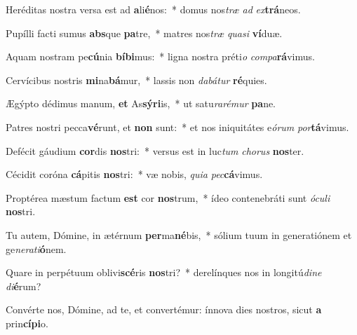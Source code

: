 \item Heréditas nostra versa est ad \textbf{a}li\textbf{é}nos:~* domus nos\textit{træ} \textit{ad} \textit{ex}\textbf{trá}neos.
\item Pupílli facti sumus \textbf{abs}que \textbf{pa}tre,~* matres nos\textit{træ} \textit{qua}\textit{si} \textbf{ví}duæ.
\item Aquam nostram pe\textbf{cú}nia \textbf{bí}\textbf{bi}mus:~* ligna nostra préti\textit{o} \textit{com}\textit{pa}\textbf{rá}vimus.
\item Cervícibus nostris \textbf{mi}na\textbf{bá}mur,~* lassis non \textit{da}\textit{bá}\textit{tur} \textbf{ré}quies.
\item Ægýpto dédimus manum, \textbf{et} As\textbf{sý}\textbf{ri}is,~* ut satu\textit{ra}\textit{ré}\textit{mur} \textbf{pa}ne.
\item Patres nostri pecca\textbf{vé}runt, et \textbf{non} sunt:~* et nos iniquitátes e\textit{ó}\textit{rum} \textit{por}\textbf{tá}vimus.
\item Defécit gáudium \textbf{cor}dis \textbf{nos}tri:~* versus est in luc\textit{tum} \textit{cho}\textit{rus} \textbf{nos}ter.
\item Cécidit coróna \textbf{cá}pitis \textbf{nos}tri:~* væ nobis, \textit{qui}\textit{a} \textit{pec}\textbf{cá}vimus.
\item Proptérea mæstum factum \textbf{est} cor \textbf{nos}trum,~* ídeo contenebráti sunt \textit{ó}\textit{cu}\textit{li} \textbf{nos}tri.
\item Tu autem, Dómine, in ætérnum \textbf{per}ma\textbf{né}bis,~* sólium tuum in generatiónem et ge\textit{ne}\textit{ra}\textit{ti}\textbf{ó}nem.
\item Quare in perpétuum oblivi\textbf{scé}ris \textbf{nos}tri?~* derelínques nos in longitú\textit{di}\textit{ne} \textit{di}\textbf{é}rum?
\item Convérte nos, Dómine, ad te, et convertémur: ínnova dies nostros, sicut \textbf{a} prin\textbf{cí}\textbf{pi}o.
